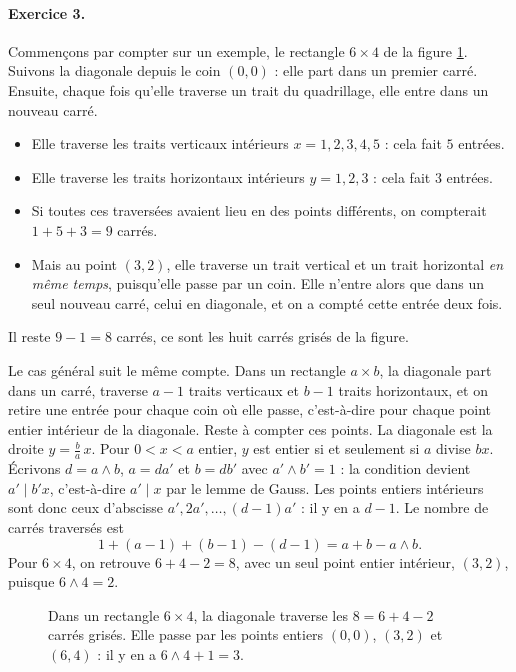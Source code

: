 \documentclass[11pt,a4paper]{article}
\theoremstyle{plain}
\theoremstyle{definition}
\theoremstyle{remark}
\newcommand{\pgcd}{\wedge}
\begin{document}
\paragraph{Exercice 3.} Commençons par compter sur un exemple, le rectangle $6\times4$ de la figure \ref{fig:diagonale}. Suivons la diagonale depuis le coin $(0,0)$ : elle part dans un premier carré. Ensuite, chaque fois qu'elle traverse un trait du quadrillage, elle entre dans un nouveau carré.
\begin{itemize}[nosep]
\item Elle traverse les traits verticaux intérieurs $x=1,2,3,4,5$ : cela fait $5$ entrées.
\item Elle traverse les traits horizontaux intérieurs $y=1,2,3$ : cela fait $3$ entrées.
\item Si toutes ces traversées avaient lieu en des points différents, on compterait $1+5+3=9$ carrés.
\item Mais au point $(3,2)$, elle traverse un trait vertical et un trait horizontal \emph{en même temps}, puisqu'elle passe par un coin. Elle n'entre alors que dans un seul nouveau carré, celui en diagonale, et on a compté cette entrée deux fois.
\end{itemize}
Il reste $9-1=8$ carrés, ce sont les huit carrés grisés de la figure.

Le cas général suit le même compte. Dans un rectangle $a\times b$, la diagonale part dans un carré, traverse $a-1$ traits verticaux et $b-1$ traits horizontaux, et on retire une entrée pour chaque coin où elle passe, c'est-à-dire pour chaque point entier intérieur de la diagonale. Reste à compter ces points. La diagonale est la droite $y=\frac ba\,x$. Pour $0<x<a$ entier, $y$ est entier si et seulement si $a$ divise $bx$. Écrivons $d=a\pgcd b$, $a=da'$ et $b=db'$ avec $a'\pgcd b'=1$ : la condition devient $a'\mid b'x$, c'est-à-dire $a'\mid x$ par le lemme de Gauss. Les points entiers intérieurs sont donc ceux d'abscisse $a', 2a', \dots, (d-1)a'$ : il y en a $d-1$. Le nombre de carrés traversés est
\[
  1+(a-1)+(b-1)-(d-1)=a+b-a\pgcd b .
\]
Pour $6\times4$, on retrouve $6+4-2=8$, avec un seul point entier intérieur, $(3,2)$, puisque $6\pgcd4=2$.

\begin{figure}[h]
\centering
{}
\caption{Dans un rectangle $6\times4$, la diagonale traverse les $8=6+4-2$ carrés grisés. Elle passe par les points entiers $(0,0)$, $(3,2)$ et $(6,4)$ : il y en a $6\wedge4+1=3$.}\label{fig:diagonale}
\end{figure}
\end{document}
